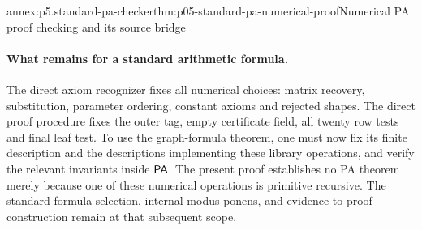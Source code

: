 \begin{annexitem}{annex:p5.standard-pa-checker}{thm:p05-standard-pa-numerical-proof}{Numerical PA proof checking and its source bridge}
\paragraph{What remains for a standard arithmetic formula.}
The direct axiom recognizer fixes all numerical choices: matrix recovery,
substitution, parameter ordering, constant axioms and rejected shapes.
The direct proof procedure fixes the outer tag, empty certificate field,
all twenty row tests and final leaf test.  To use the graph-formula theorem,
one must now fix its finite description and the descriptions implementing
these library operations, and verify the relevant invariants inside \(\mathsf{PA}\).
The present proof establishes no PA theorem merely because one of these
numerical operations is primitive recursive.  The standard-formula selection,
internal modus ponens, and evidence-to-proof construction remain at that
subsequent scope.
\end{annexitem}
